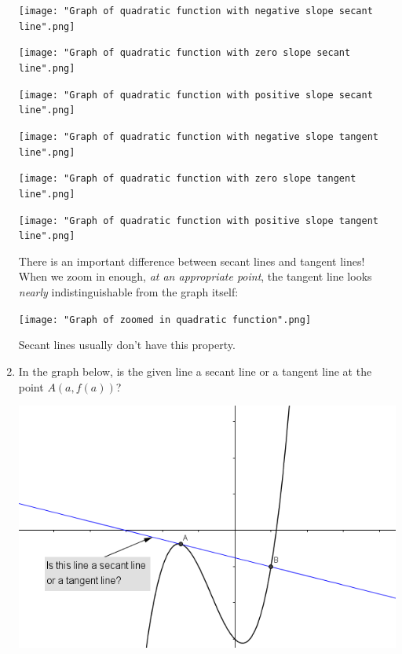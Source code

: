 \documentclass[nooutcomes,handout]{ximera}
\begin{document}
\begin{problem}
\begin{enumerate}
\begin{freeResponse} \hfil
	\begin{image}
           \texttt{[image: "Graph of quadratic function with negative slope secant line".png]}
         \end{image}
         \begin{image}
           \texttt{[image: "Graph of quadratic function with zero slope secant line".png]}
         \end{image}
         \begin{image}
           \texttt{[image: "Graph of quadratic function with positive slope secant line".png]}
         \end{image}
          \begin{image}
            \texttt{[image: "Graph of quadratic function with negative slope tangent line".png]}
          \end{image}
          \begin{image}
            \texttt{[image: "Graph of quadratic function with zero slope tangent line".png]}
          \end{image}
          \begin{image}
            \texttt{[image: "Graph of quadratic function with positive slope tangent line".png]}
          \end{image}
          There is an important difference between secant lines and tangent lines!
          When we zoom in enough, \emph{at an appropriate point}, the tangent line looks \emph{nearly} indistinguishable from the graph itself:
          \begin{image}
            \texttt{[image: "Graph of zoomed in quadratic function".png]}
          \end{image}
          Secant lines usually don't have this property.
	\end{freeResponse}

		\item In the graph below, is the given line a secant line or a tangent line at the point $A(a,f(a))$?
		\begin{image}
		 \includegraphics[scale = 0.7]{figure1.png}
		\end{image}


\end{enumerate}
\end{problem}
\end{document}
